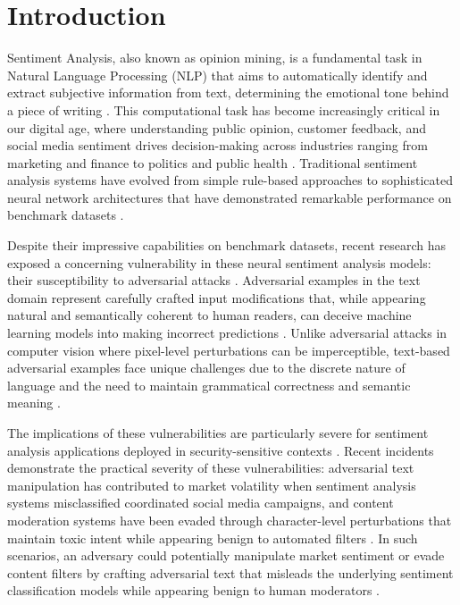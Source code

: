 \documentclass[../main.tex]{subfiles}
\begin{document}
\section{Introduction}

\label{sec:sentiment_intro}

Sentiment Analysis, also known as opinion mining, is a fundamental task in Natural Language Processing (NLP) that aims to automatically identify and extract subjective information from text, determining the emotional tone behind a piece of writing \cite{jin2019textfooler}. This computational task has become increasingly critical in our digital age, where understanding public opinion, customer feedback, and social media sentiment drives decision-making across industries ranging from marketing and finance to politics and public health \cite{morris2020textattack}. Traditional sentiment analysis systems have evolved from simple rule-based approaches to sophisticated neural network architectures that have demonstrated remarkable performance on benchmark datasets \cite{miyato2017virtual}.

Despite their impressive capabilities on benchmark datasets, recent research has exposed a concerning vulnerability in these neural sentiment analysis models: their susceptibility to adversarial attacks \cite{jin2019textfooler}\cite{li2018textbugger}. Adversarial examples in the text domain represent carefully crafted input modifications that, while appearing natural and semantically coherent to human readers, can deceive machine learning models into making incorrect predictions \cite{gao2018deepwordbug}. Unlike adversarial attacks in computer vision where pixel-level perturbations can be imperceptible, text-based adversarial examples face unique challenges due to the discrete nature of language and the need to maintain grammatical correctness and semantic meaning \cite{morris2020textattack}.

The implications of these vulnerabilities are particularly severe for sentiment analysis applications deployed in security-sensitive contexts \cite{jin2019textfooler}. Recent incidents demonstrate the practical severity of these vulnerabilities: adversarial text manipulation has contributed to market volatility when sentiment analysis systems misclassified coordinated social media campaigns, and content moderation systems have been evaded through character-level perturbations that maintain toxic intent while appearing benign to automated filters \cite{vazquez2023white}\cite{oroy2024adversarial}. In such scenarios, an adversary could potentially manipulate market sentiment or evade content filters by crafting adversarial text that misleads the underlying sentiment classification models while appearing benign to human moderators \cite{gao2018deepwordbug}.
\end{document}
